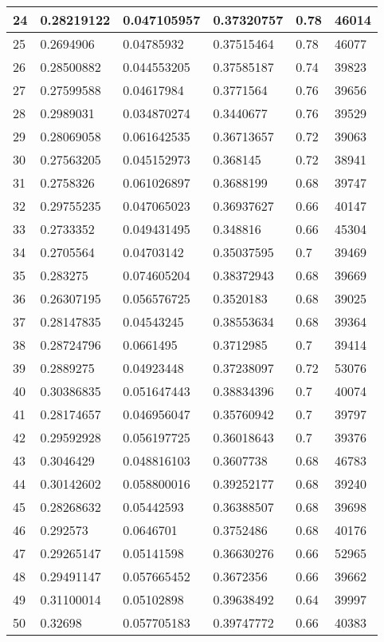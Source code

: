 \begin{longtable}{|l|l|l|l|l|l|}
24 & 0.28219122 & 0.047105957 & 0.37320757 & 0.78 & 46014 \\ \hline 
25 & 0.2694906 & 0.04785932 & 0.37515464 & 0.78 & 46077 \\ \hline 
26 & 0.28500882 & 0.044553205 & 0.37585187 & 0.74 & 39823 \\ \hline 
27 & 0.27599588 & 0.04617984 & 0.3771564 & 0.76 & 39656 \\ \hline 
28 & 0.2989031 & 0.034870274 & 0.3440677 & 0.76 & 39529 \\ \hline 
29 & 0.28069058 & 0.061642535 & 0.36713657 & 0.72 & 39063 \\ \hline 
30 & 0.27563205 & 0.045152973 & 0.368145 & 0.72 & 38941 \\ \hline 
31 & 0.2758326 & 0.061026897 & 0.3688199 & 0.68 & 39747 \\ \hline 
32 & 0.29755235 & 0.047065023 & 0.36937627 & 0.66 & 40147 \\ \hline 
33 & 0.2733352 & 0.049431495 & 0.348816 & 0.66 & 45304 \\ \hline 
34 & 0.2705564 & 0.04703142 & 0.35037595 & 0.7 & 39469 \\ \hline 
35 & 0.283275 & 0.074605204 & 0.38372943 & 0.68 & 39669 \\ \hline 
36 & 0.26307195 & 0.056576725 & 0.3520183 & 0.68 & 39025 \\ \hline 
37 & 0.28147835 & 0.04543245 & 0.38553634 & 0.68 & 39364 \\ \hline 
38 & 0.28724796 & 0.0661495 & 0.3712985 & 0.7 & 39414 \\ \hline 
39 & 0.2889275 & 0.04923448 & 0.37238097 & 0.72 & 53076 \\ \hline 
40 & 0.30386835 & 0.051647443 & 0.38834396 & 0.7 & 40074 \\ \hline 
41 & 0.28174657 & 0.046956047 & 0.35760942 & 0.7 & 39797 \\ \hline 
42 & 0.29592928 & 0.056197725 & 0.36018643 & 0.7 & 39376 \\ \hline 
43 & 0.3046429 & 0.048816103 & 0.3607738 & 0.68 & 46783 \\ \hline 
44 & 0.30142602 & 0.058800016 & 0.39252177 & 0.68 & 39240 \\ \hline 
45 & 0.28268632 & 0.05442593 & 0.36388507 & 0.68 & 39698 \\ \hline 
46 & 0.292573 & 0.0646701 & 0.3752486 & 0.68 & 40176 \\ \hline 
47 & 0.29265147 & 0.05141598 & 0.36630276 & 0.66 & 52965 \\ \hline 
48 & 0.29491147 & 0.057665452 & 0.3672356 & 0.66 & 39662 \\ \hline 
49 & 0.31100014 & 0.05102898 & 0.39638492 & 0.64 & 39997 \\ \hline 
50 & 0.32698 & 0.057705183 & 0.39747772 & 0.66 & 40383 \\ \hline 
\end{longtable}